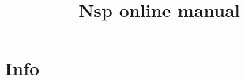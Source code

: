 \documentclass[11pt]{book}
\title{Nsp online manual}
\begin{document}
\maketitle

\tableofcontents

\chapter{Info}

 
\printindex
\end{document}
